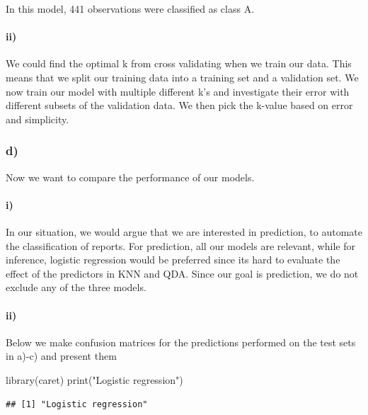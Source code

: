 \documentclass[
]{article}
\newenvironment{Shaded}{\begin{snugshade}}{\end{snugshade}}
\newcommand{\FunctionTok}[1]{\textcolor[rgb]{0.00,0.00,0.00}{#1}}
\newcommand{\NormalTok}[1]{#1}
\newcommand{\StringTok}[1]{\textcolor[rgb]{0.31,0.60,0.02}{#1}}
\begin{document}
In this model, 441 observations were classified as class A.

\hypertarget{ii-4}{%
\paragraph{ii)}\label{ii-4}}

We could find the optimal k from cross validating when we train our
data. This means that we split our training data into a training set and
a validation set. We now train our model with multiple different k's and
investigate their error with different subsets of the validation data.
We then pick the k-value based on error and simplicity.

\hypertarget{d-2}{%
\subsubsection{d)}\label{d-2}}

Now we want to compare the performance of our models.

\hypertarget{i-6}{%
\paragraph{i)}\label{i-6}}

In our situation, we would argue that we are interested in prediction,
to automate the classification of reports. For prediction, all our
models are relevant, while for inference, logistic regression would be
preferred since its hard to evaluate the effect of the predictors in KNN
and QDA. Since our goal is prediction, we do not exclude any of the
three models.

\hypertarget{ii-5}{%
\paragraph{ii)}\label{ii-5}}

Below we make confusion matrices for the predictions performed on the
test sets in a)-c) and present them

\begin{Shaded}
\begin{Highlighting}[]
\FunctionTok{library}\NormalTok{(caret)}
\FunctionTok{print}\NormalTok{(}\StringTok{"Logistic regression"}\NormalTok{)}
\end{Highlighting}
\end{Shaded}

\begin{verbatim}
## [1] "Logistic regression"
\end{verbatim}
\end{document}
